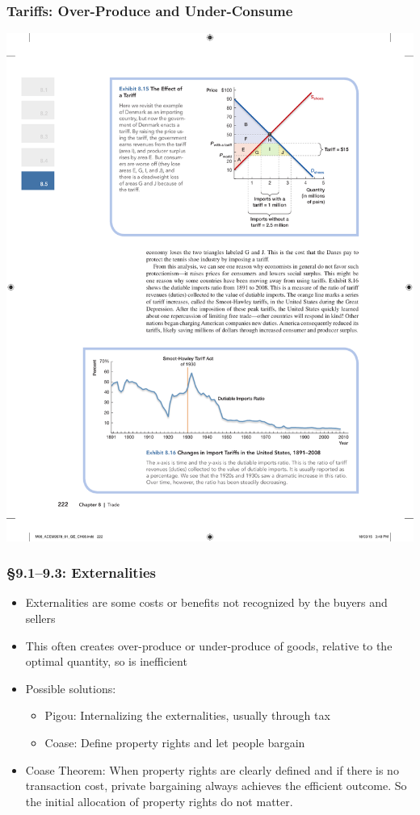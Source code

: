 \documentclass[12pt, xcolor=dvipsnames]{beamer}
\begin{document}
\begin{frame}
\frametitle{\bf Tariffs: Over-Produce and Under-Consume}
\begin{center}
\includegraphics[height=.85\textheight]{figures/4.pdf}
\end{center}
\end{frame}

\begin{frame}
\frametitle{\bf §9.1--9.3: Externalities}
\begin{itemize}
\item Externalities are some costs or benefits not recognized by the buyers and sellers
\item This often creates over-produce or under-produce of goods, relative to the optimal quantity, so is inefficient
\item Possible solutions:
\begin{itemize}
\item Pigou: Internalizing the externalities, usually through tax
\item Coase: Define property rights and let people bargain
\end{itemize}
\item Coase Theorem: When property rights are clearly defined and if there is no transaction cost, private bargaining always achieves the efficient outcome. So the initial allocation of property rights do not matter.
\end{itemize}
\end{frame}
\end{document}
